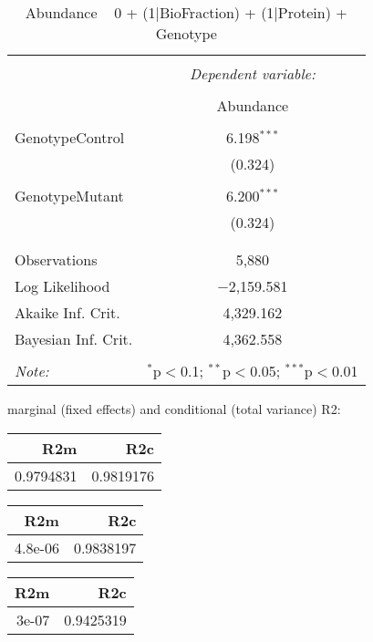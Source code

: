 \documentclass[11pt]{report}
\begin{document}
\begin{table}[!htbp] \centering 
  \caption{Abundance ~ 0 + (1|BioFraction) + (1|Protein) + Genotype} 
  \label{} 
\begin{tabular}{@{\extracolsep{5pt}}lc} 
\\[-1.8ex]\hline 
\hline \\[-1.8ex] 
 & \multicolumn{1}{c}{\textit{Dependent variable:}} \\ 
\cline{2-2} 
\\[-1.8ex] & Abundance \\ 
\hline \\[-1.8ex] 
 GenotypeControl & 6.198$^{***}$ \\ 
  & (0.324) \\ 
  & \\ 
 GenotypeMutant & 6.200$^{***}$ \\ 
  & (0.324) \\ 
  & \\ 
\hline \\[-1.8ex] 
Observations & 5,880 \\ 
Log Likelihood & $-$2,159.581 \\ 
Akaike Inf. Crit. & 4,329.162 \\ 
Bayesian Inf. Crit. & 4,362.558 \\ 
\hline 
\hline \\[-1.8ex] 
\textit{Note:}  & \multicolumn{1}{r}{$^{*}$p$<$0.1; $^{**}$p$<$0.05; $^{***}$p$<$0.01} \\ 
\end{tabular} 
\end{table} 
marginal (fixed effects) and conditional (total variance) R2:

\begin{tabular}{r|r}
\hline
R2m & R2c\\
\hline
0.9794831 & 0.9819176\\
\hline
\end{tabular}

\begin{tabular}{r|r}
\hline
R2m & R2c\\
\hline
4.8e-06 & 0.9838197\\
\hline
\end{tabular}

\begin{tabular}{r|r}
\hline
R2m & R2c\\
\hline
3e-07 & 0.9425319\\
\hline
\end{tabular}
\end{document}

